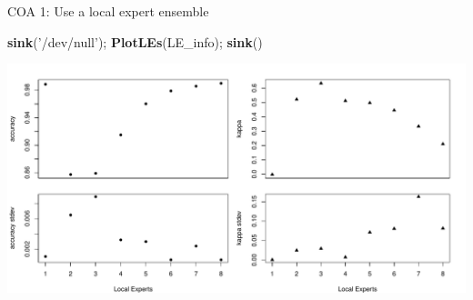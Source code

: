 \documentclass[ignorenonframetext,]{beamer}
\newenvironment{Shaded}{\begin{snugshade}}{\end{snugshade}}
\newcommand{\KeywordTok}[1]{\textcolor[rgb]{0.13,0.29,0.53}{\textbf{{#1}}}}
\newcommand{\StringTok}[1]{\textcolor[rgb]{0.31,0.60,0.02}{{#1}}}
\newcommand{\NormalTok}[1]{{#1}}
\begin{document}
\begin{frame}[fragile]{COA 1: Use a local expert ensemble}

\footnotesize

\begin{Shaded}
\begin{Highlighting}[]
\KeywordTok{sink}\NormalTok{(}\StringTok{'/dev/null'}\NormalTok{); }\KeywordTok{PlotLEs}\NormalTok{(LE_info); }\KeywordTok{sink}\NormalTok{()}
\end{Highlighting}
\end{Shaded}

\includegraphics{presentation_files/figure-beamer/unnamed-chunk-13-1.pdf}

\end{frame}
\end{document}
